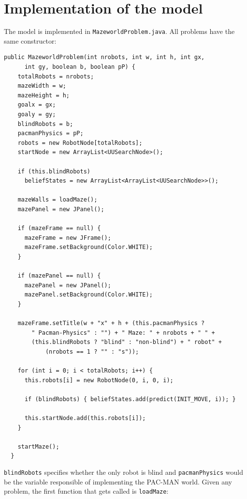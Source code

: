 \documentclass{article}
\begin{document}
\section{Implementation of the model}\label{sec:model}
The model is implemented in  \verb`MazeworldProblem.java`. All problems have the same constructor:\\
\begin{lstlisting}
public MazeworldProblem(int nrobots, int w, int h, int gx,   
      int gy, boolean b, boolean pP) {
    totalRobots = nrobots;
    mazeWidth = w;
    mazeHeight = h;
    goalx = gx;
    goaly = gy;
    blindRobots = b;
    pacmanPhysics = pP;
    robots = new RobotNode[totalRobots];
    startNode = new ArrayList<UUSearchNode>();
    
    if (this.blindRobots)
      beliefStates = new ArrayList<ArrayList<UUSearchNode>>();
    
    mazeWalls = loadMaze();
    mazePanel = new JPanel();
    
    if (mazeFrame == null) {
      mazeFrame = new JFrame();
      mazeFrame.setBackground(Color.WHITE);
    }
    
    if (mazePanel == null) {
      mazePanel = new JPanel();
      mazePanel.setBackground(Color.WHITE);
    }
    
    mazeFrame.setTitle(w + "x" + h + (this.pacmanPhysics ? 
        " Pacman-Physics" : "") + " Maze: " + nrobots + " " +
        (this.blindRobots ? "blind" : "non-blind") + " robot" +
            (nrobots == 1 ? "" : "s"));
    
    for (int i = 0; i < totalRobots; i++) {
      this.robots[i] = new RobotNode(0, i, 0, i);
      
      if (blindRobots) { beliefStates.add(predict(INIT_MOVE, i)); }
      
      this.startNode.add(this.robots[i]);
    } 
    
    startMaze();
  }
\end{lstlisting}

\verb`blindRobots` specifies whether the only robot is blind and \verb`pacmanPhysics` would be the variable responsible of implementing the PAC-MAN world. Given any problem, the first function that gets called is \verb`loadMaze`:\\
\end{document}
